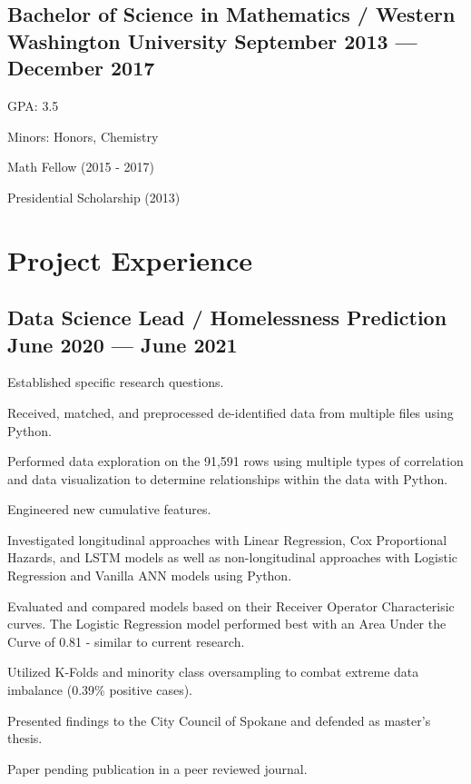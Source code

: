 \documentclass[letter,10pt]{article}
\begin{document}
\subsection{{Bachelor of Science in Mathematics / Western Washington University \hfill September 2013 --- December 2017}}
\begin{zitemize}
    \item GPA: 3.5
    \item Minors: Honors, Chemistry
    \item Math Fellow (2015 - 2017)
    \item Presidential Scholarship (2013)
\end{zitemize}

\section{Project Experience}
\subsection{{Data Science Lead / Homelessness Prediction \hfill June 2020 --- June 2021}}
\begin{zitemize}
    \item Established specific research questions.
    \item Received, matched, and preprocessed de-identified data from multiple files using Python.
    \item Performed data exploration on the 91,591 rows using multiple types of correlation and data visualization to determine relationships within the data with Python.
    \item Engineered new cumulative features.
    \item Investigated longitudinal approaches with Linear Regression, Cox Proportional Hazards, and LSTM models as well as non-longitudinal approaches with Logistic Regression and Vanilla ANN models using Python.
    \item Evaluated and compared models based on their Receiver Operator Characterisic curves. The Logistic Regression model performed best with an Area Under the Curve of 0.81 - similar to current research.
    \item Utilized K-Folds and minority class oversampling to combat extreme data imbalance (0.39\% positive cases).
    \item Presented findings to the City Council of Spokane and defended as master's thesis. 
    \item Paper pending publication in a peer reviewed journal.
\end{zitemize}
\end{document}
